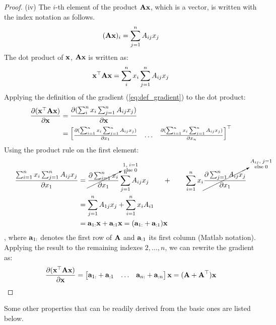 \documentclass[a4paper]{article}
\begin{document}
\begin{proof}
(iv) %
The $i$-th element of the product $\textbf{A}\textbf{x}$, which is a vector, is written with the index notation as follows.
\[
(\textbf{A}\textbf{x})_i = \sum_{j=1}^n A_{ij}x_{j}
\]
The dot product of $\textbf{x}$, $\textbf{A}\textbf{x}$ is written as:
\[
\textbf{x}^{\top} \textbf{A} \textbf{x} = \sum_{i}^n x_i \sum_{j=1}^n A_{ij}x_{j}
\]
Applying the definition of the gradient (\eqref{eq:def_gradient}) to the dot product:
\begin{align*}
\frac{\partial(\textbf{x}^{\top} \textbf{A} \textbf{x})}{\partial \textbf{x}} &= \frac{\partial(\sum_{i}^n x_i \sum_{j=1}^n A_{ij}x_{j})}{\partial \textbf{x}}   \\
&= \begin{bmatrix}
\frac{\partial(\sum_{i=1}^n x_i \sum_{j=1}^n A_{ij}x_{j})}{\partial x_1} & \ldots &
\frac{\partial(\sum_{i=1}^n x_i \sum_{j=1}^n A_{ij}x_{j})}{\partial x_n} \\
\end{bmatrix}^{\top}
\end{align*}
Using the product rule on the first element:
\begin{align*}
\frac{\sum_{i=1}^n x_i \sum_{j=1}^n A_{ij}x_{j}}{\partial x_1} &= \cancelto{\substack{1,\; i=1\\\text{else}\; 0}}{\frac{\partial \sum_{i=1}^n x_i}{\partial x_1}}\sum_{j=1}^n A_{ij}x_{j} \qquad + \qquad \sum_{i=1}^n x_i \cancelto{\substack{A_{ij},\; j=1\\\text{else}\; 0}}{\frac{\partial \sum_{j=1}^n A_{ij}x_{j}}{\partial x_1}} \\
&= \sum_{j=1}^n A_{1j}x_{j} +  \sum_{i=1}^n x_i A_{i1}\\
&= \textbf{a}_{1:}\textbf{x} + \textbf{a}_{:1}\textbf{x} = (\textbf{a}_{1:} + \textbf{a}_{:1}) \textbf{x}
\end{align*}
, where $\textbf{a}_{1:}$ denotes the first row of $\textbf{A}$ and $\textbf{a}_{:1}$ its first column (Matlab notation). Applying the result to the remaining indexes $2,\ldots,n$, we can rewrite the gradient as:
\[
\frac{\partial(\textbf{x}^{\top} \textbf{A} \textbf{x})}{\partial \textbf{x}} = 
\begin{bmatrix}
\textbf{a}_{1:} + \textbf{a}_{:1} & \ldots & \textbf{a}_{n:} + \textbf{a}_{:n}
\end{bmatrix}
\textbf{x} = (\textbf{A} + \textbf{A}^{\top})\textbf{x}
\]
\end{proof}

Some other properties that can be readily derived from the basic ones are listed below.
\end{document}
